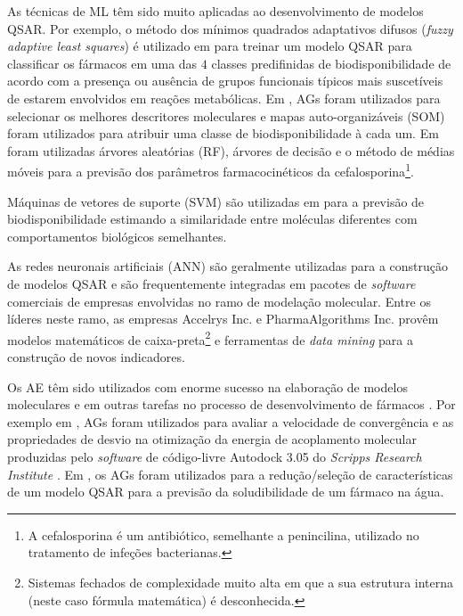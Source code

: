As técnicas de \ac{ML} têm sido muito aplicadas ao desenvolvimento de modelos \ac{QSAR}. 
Por exemplo, o método dos mínimos quadrados adaptativos difusos (\emph{fuzzy adaptive least squares}) é utilizado em \citep{Yoshida2000}
para treinar um modelo \ac{QSAR} para classificar os fármacos em uma das $4$ classes predifinidas de biodisponibilidade de acordo com a presença ou
ausência de grupos funcionais típicos mais suscetíveis de estarem envolvidos em reações metabólicas. Em \citep{pintore2003prediction},
\acp{AG} foram utilizados para selecionar os melhores descritores moleculares e mapas auto-organizáveis (\ac{SOM}) 
foram utilizados para atribuir uma classe de biodisponibilidade à cada um. Em
\citep{dureja2008topological} foram utilizadas
árvores aleatórias (\ac{RF}), árvores de decisão e o método de médias móveis para a previsão dos parâmetros farmacocinéticos
da cefalosporina\footnote{A cefalosporina é um antibiótico, semelhante a penincilina, utilizado no tratamento de infeções bacterianas.}.

Máquinas de vetores de suporte (\ac{SVM}) são utilizadas em \citep{frohlich2006kernel} para a previsão de 
biodisponibilidade estimando a similaridade entre moléculas diferentes com comportamentos biológicos semelhantes. 

As redes neuronais artificiais (\ac{ANN}) são geralmente utilizadas para a construção de modelos \ac{QSAR} \citep{zupan1999neural} e são frequentemente
integradas em pacotes de \emph{software} comerciais de empresas envolvidas no ramo de modelação molecular. Entre os líderes neste ramo,
as empresas Accelrys Inc. \citep{accelrys2004modeling} e PharmaAlgorithms Inc. \citep{pharma2006adme} provêm modelos matemáticos de 
caixa-preta\footnote{Sistemas fechados de complexidade muito alta em que a sua estrutura interna (neste caso fórmula matemática) é desconhecida.}
e ferramentas de \emph{data mining} para a construção de novos indicadores.


Os \ac{AE} têm sido utilizados com enorme sucesso na elaboração de modelos moleculares 
\citep{clark1996evolutionary} e em outras tarefas no processo de desenvolvimento de fármacos \citep{lameijer2005evolutionary}. 
Por exemplo em \citep{ordog2008evaluating}, \acp{AG} foram utilizados para avaliar a 
velocidade de convergência e as propriedades de desvio na otimização da energia de acoplamento molecular produzidas pelo 
\emph{software} de código-livre Autodock 3.05 do \emph{Scripps Research Institute} \citep{morris1998automated}. Em 
\citep{wegner2003prediction}, os \acp{AG} foram utilizados para a redução/seleção de características de um modelo \ac{QSAR} 
para a previsão da soludibilidade de um fármaco na água.

